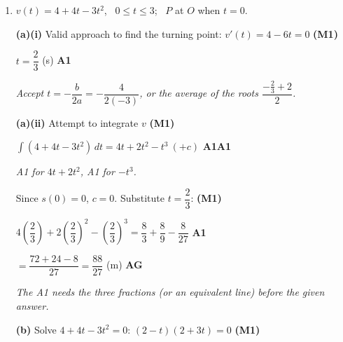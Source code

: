 \documentclass[12pt, twoside]{article}
\begin{document}
\begin{enumerate}[itemsep=0.3cm]
$\displaystyle = \lim_{x \to 0}\frac{2x^{2} - \frac{8x^{4}}{3} + \cdots}
{\frac{x^{2}}{2} + \frac{5x^{4}}{24}}
= \lim_{x \to 0}\frac{2 - \frac{8x^{2}}{3} + \cdots}{\frac{1}{2} + \frac{5x^{2}}{24}}$
\hfill \textbf{A1}

$= 4$ \hfill \textbf{A1}

\emph{Do not award the M1 unless $x$ is replaced by $2x$ in the
$\arctan$ series. Condone a missing ``$\lim$'' and errors in the
higher-order terms. Only the leading terms $2x^{2}$ and $\dfrac{x^{2}}{2}$
are needed for the answer.}

\emph{L'H\^opital's rule gives the same limit but earns no marks: the
question requires the Maclaurin series.}

\newpage

\item[2.] 

$v(t) = 4 + 4t - 3t^{2}$, \ $0 \leq t \leq 3$; \ $P$ at $O$ when $t = 0$.

\medskip

\textbf{(a)(i)} Valid approach to find the turning point:
$v'(t) = 4 - 6t = 0$ \hfill \textbf{(M1)}

$t = \dfrac{2}{3}$ (s) \hfill \textbf{A1}

\emph{Accept $t = -\dfrac{b}{2a} = -\dfrac{4}{2(-3)}$, or the average of the
roots $\dfrac{-\frac{2}{3} + 2}{2}$.}

\textbf{(a)(ii)} Attempt to integrate $v$ \hfill \textbf{(M1)}

$\displaystyle\int (4 + 4t - 3t^{2})\, dt = 4t + 2t^{2} - t^{3} \ (+c)$
\hfill \textbf{A1A1}

\emph{A1 for $4t + 2t^{2}$, A1 for $-t^{3}$.}

Since $s(0) = 0$, $c = 0$. Substitute $t = \dfrac{2}{3}$: \hfill \textbf{(M1)}

$4\left(\dfrac{2}{3}\right) + 2\left(\dfrac{2}{3}\right)^{2}
- \left(\dfrac{2}{3}\right)^{3}
= \dfrac{8}{3} + \dfrac{8}{9} - \dfrac{8}{27}$ \hfill \textbf{A1}

$= \dfrac{72 + 24 - 8}{27} = \dfrac{88}{27}$ (m) \hfill \textbf{AG}

\emph{The A1 needs the three fractions (or an equivalent line) before the
given answer.}

\medskip

\textbf{(b)} Solve $4 + 4t - 3t^{2} = 0$: $(2 - t)(2 + 3t) = 0$
\hfill \textbf{(M1)}


\end{enumerate}
\end{document}
